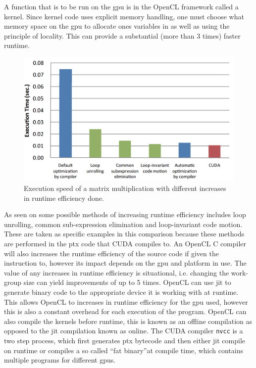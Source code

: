 A function that is to be run on the \acrshort{gpu} is in the OpenCL framework called a kernel.
Since kernel code uses explicit memory handling, one must choose what memory space on the \acrshort{gpu} to allocate ones variables in as well as using the principle of locality.
This can provide a substantial (more than 3 times) faster runtime. \citep{ocl_lecture3}
\begin{figure}[h]
\centering	
 \includegraphics[width=1\textwidth]{figures/opencloptimisation.png} %
\caption{Execution speed of a matrix multiplication with different increases in runtime efficiency done. \citep{CUDAOpenCLOptimisation}}\label{image:OpenCLOptCompare}
\vspace{-15pt}
\end{figure}
As seen on  some possible methods of increasing runtime efficiency includes loop unrolling, common sub-expression elimination and loop-invariant code motion. 
These are taken as specific examples in this comparison because these methods are performed in the \acrfull{ptx} code that CUDA compiles to. %
An OpenCL C compiler will also increases the runtime efficiency of the source code if given the instruction to, however its impact depends on the \acrshort{gpu} and platform in use.
The value of any increases in runtime efficiency is situational, i.e. changing the work-group size can yield improvements of up to 5 times. \citep{ocl_lecture3}
OpenCL can use \acrshort{jit} to generate binary code to the appropriate device it is working with at runtime.
This allows OpenCL to increases in runtime efficiency for the \acrshort{gpu} used, however this is also a constant overhead for each execution of the program. 
OpenCL can also compile the kernels before runtime, this is known as an offline compilation as opposed to the \acrshort{jit} compilation known as online. 
The CUDA compiler \texttt{nvcc} is a two step process, which first generates \acrshort{ptx} bytecode and then either \acrshort{jit} compile on runtime or compiles a so called ``fat binary''at compile time, which contains multiple programs for different \acrshort{gpu}s. \citep{nvidia_cude_fat_bin}

